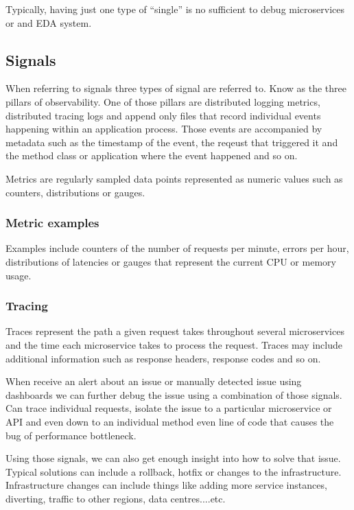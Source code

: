 \documentclass[a4paper, 11pt]{book}
\begin{document}
    Typically, having just one type of ``single'' is no sufficient to debug microservices or and EDA system.

    \subsection{Signals}
    When referring to signals three types of signal are referred to.
    Know as the three pillars of observability.
    One of those pillars are distributed logging metrics, distributed tracing logs and append only files that record individual events happening within an application process.
    Those events are accompanied by metadata such as the timestamp of the event, the reqeust that triggered it and the method class or application where the event happened and so on.

    Metrics are regularly sampled data points represented as numeric values such as counters, distributions or gauges.

    \subsubsection{Metric examples}
    Examples include counters of the number of requests per minute, errors per hour, distributions of latencies or gauges that represent the current CPU or memory usage.

    \subsubsection{Tracing}
    Traces represent the path a given request takes throughout several microservices and the time each microservice takes to process the request.
    Traces may include additional information such as response headers, response codes and so on.

    When receive an alert about an issue or manually detected issue using dashboards we can further debug the issue using a combination of those signals.
    Can trace individual requests, isolate the issue to a particular microservice or API and even down to an individual method even line of code that causes the bug of performance bottleneck.

    Using those signals, we can also get enough insight into how to solve that issue.
    Typical solutions can include a rollback, hotfix or changes to the infrastructure.
    Infrastructure changes can include things like adding more service instances, diverting, traffic to other regions, data centres....etc.
\end{document}
